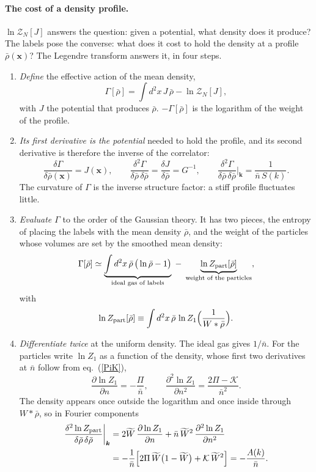 \documentclass[11pt,aps,preprint,nofootinbib,superscriptaddress,tightenlines]{revtex4-2}
\def\st{\begin{equation}}
\def\stp{\end{equation}}
\def\Eq#1{eq.~(\ref{#1})}
\let\oldparagraph\paragraph
\renewcommand{\paragraph}{\par\bigskip\oldparagraph}
\begin{document}
\paragraph{The cost of a density profile.}  $\ln\mathcal Z_N[J]$ answers the question: given a potential, what density does it produce?  The labels pose the
converse: what does it cost to hold the density at a profile $\bar\rho(\bm x)$?  The Legendre transform answers it, in four steps.
\begin{enumerate}
\item \emph{Define} the effective action of the mean density,
  \st
  \Gamma[\bar\rho]=\int d^2x\,J\,\bar\rho-\ln\mathcal Z_N[J],
  \stp
  with $J$ the potential that produces $\bar\rho$.  $-\Gamma[\bar\rho]$ is the logarithm of the weight of the profile.
\item \emph{Its first derivative is the potential} needed to hold the profile, and its second derivative is therefore the inverse of the correlator:
  \st
  \frac{\delta\Gamma}{\delta\bar\rho(\bm x)}=J(\bm x),\qquad
  \frac{\delta^2\Gamma}{\delta\bar\rho\,\delta\bar\rho}=\frac{\delta J}{\delta\bar\rho}=G^{-1},\qquad
  \frac{\delta^2\Gamma}{\delta\bar\rho\,\delta\bar\rho}\bigg|_{\bm k}=\frac1{\bar n\,S(k)} .
  \label{Gamma2}
  \stp
  The curvature of $\Gamma$ is the inverse structure factor: a stiff profile fluctuates little.
\item \emph{Evaluate $\Gamma$} to the order of the Gaussian theory.  It has two pieces, the entropy of placing the labels with the mean density $\bar\rho$, and the
  weight of the particles whose volumes are set by the smoothed mean density:
  \st
  \Gamma[\bar\rho]\simeq\underbrace{\int d^2x\,\bar\rho\,\big(\ln\bar\rho-1\big)}_{\text{ideal gas of labels}}
  \;-\;\underbrace{\ln Z_{\rm part}[\bar\rho]}_{\text{weight of the particles}},
  \stp
  with
  \st
  \ln Z_{\rm part}[\bar\rho]\equiv\int d^2x\,\bar\rho\,\ln Z_1\Big(\frac1{W*\bar\rho}\Big) .
  \stp
\item \emph{Differentiate twice} at the uniform density.  The ideal gas gives $1/\bar n$.  For the particles write $\ln Z_1$ as a function of the density,
  whose first two derivatives at $\bar n$ follow from \Eq{PiK},
  \st
  \frac{\partial\ln Z_1}{\partial n}=-\frac{\Pi}{\bar n},\qquad \frac{\partial^2\ln Z_1}{\partial n^2}=\frac{2\Pi-\mathcal K}{\bar n^2} .
  \stp
  The density appears once outside the logarithm and once inside through $W*\bar\rho$, so in Fourier components
  \st
  \begin{aligned}
  \frac{\delta^2\ln Z_{\rm part}}{\delta\bar\rho\,\delta\bar\rho}\bigg|_{\bm k}&=2\widetilde W\,\frac{\partial\ln Z_1}{\partial n}+\bar n\,\widetilde W^2\,\frac{\partial^2\ln Z_1}{\partial n^2}\\
  &=-\frac1{\bar n}\Big[2\Pi\,\widetilde W\big(1-\widetilde W\big)+\mathcal K\,\widetilde W^2\Big]=-\frac{A(k)}{\bar n} .
  \end{aligned}
  \stp
\end{enumerate}
\end{document}
